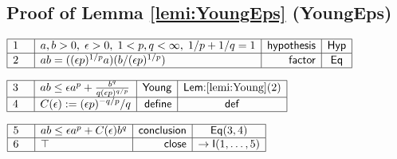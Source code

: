 \documentclass[11pt,reqno]{amsart}
\begin{document}
	\subsection*{Proof of Lemma \protect\ref{lemi:YoungEps} (\textsf{YoungEps})}
	\noindent$\begin{array}{|m{0.5cm}|l|r|c|}
	\hline
	1 & a,b>0,\;\epsilon>0,\;1<p,q<\infty,\;1/p+1/q=1 & \mathsf{hypothesis} & \mathsf{Hyp} \\ \hline
	2 & ab=((\epsilon p)^{1/p}a)(b/(\epsilon p)^{1/p}) & \mathsf{factor} & \mathsf{Eq} \\ \hline
	\end{array}$
	\par\nointerlineskip\noindent$\begin{array}{|m{0.5cm}|l|r|c|}
	\hline
	3 & ab\le\epsilon a^{p}+\frac{b^{q}}{q(\epsilon p)^{q/p}} & \mathsf{Young} & \textsf{Lem:}\ref{lemi:Young}(2) \\ \hline
	4 & C(\epsilon):=(\epsilon p)^{-q/p}/q & \mathsf{define} & \mathsf{def} \\ \hline
	\end{array}$
	\par\nointerlineskip\noindent$\begin{array}{|m{0.5cm}|l|r|c|}
	\hline
	5 & ab\le\epsilon a^{p}+C(\epsilon)b^{q} & \mathsf{conclusion} & \mathsf{Eq}(3,4) \\ \hline
	6 & \top & \mathsf{close} & \to\mathsf{I}(1,\dots,5) \\ \hline
	\end{array}$
	\medskip
	
\end{document}
